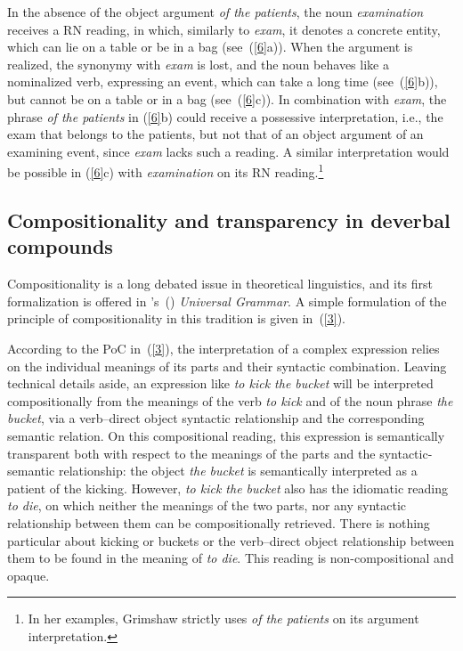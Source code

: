 \documentclass[output=paper]{langsci/langscibook}
\begin{document}
In the absence of the object argument \textit{of the patients}, the noun \textit{examination} receives a RN reading, in which, similarly to \textit{exam}, it denotes a concrete entity, which can lie on a table  {or be in a bag} (see~(\ref{6}a)). When the argument is realized, the synonymy with \textit{exam} is lost, and the noun behaves like a nominalized verb, expressing an event, which can take a long time (see~(\ref{6}b)), but cannot be on a table or in a bag (see~(\ref{6}c)).  {In combination with \textit{exam}, the phrase \textit{of the patients} in (\ref{6}b) could receive a possessive interpretation, i.e., the exam that belongs to the patients, but not that of an object argument of an examining event, since \textit{exam} lacks such a reading. A similar interpretation would be possible in (\ref{6}c) with \textit{examination} on its RN reading.}\footnote{In her examples, Grimshaw strictly uses \textit{of the patients} on its argument interpretation.}





\subsection{Compositionality and transparency in deverbal compounds}\label{sec:intro:compositionality}

Compositionality is a long debated issue in theoretical linguistics, and its first formalization is offered in \citeauthor{montague:70}'s~(\citeyear{montague:70}) \textit{Universal Grammar}.
A simple formulation of the principle of compositionality in this tradition  {is given in~(\ref{3})}.

\begin{exe}
\end{exe}

According to the PoC in~(\ref{3}), the interpretation of a complex expression relies on the individual meanings of its parts and their syntactic combination. Leaving technical details aside, an expression like \textit{to kick the bucket} will be interpreted compositionally from the meanings of the verb \textit{to kick} and of the noun phrase \textit{the bucket}, via a verb--direct object syntactic relationship and the corresponding semantic relation. On this compositional reading, this expression is semantically transparent both with respect to the  meanings of the parts and the syntactic-semantic relationship: the object \textit{the bucket} is semantically interpreted as a patient of the kicking. However, \textit{to kick the bucket} also has the idiomatic reading \textit{to die}, on which neither the meanings of the two parts, nor any syntactic relationship between them can be compositionally retrieved. There is nothing particular about kicking or buckets or the verb--direct object relationship between them to be found in the meaning of \textit{to die}. This reading is non-compositional and  opaque.
\end{document}
